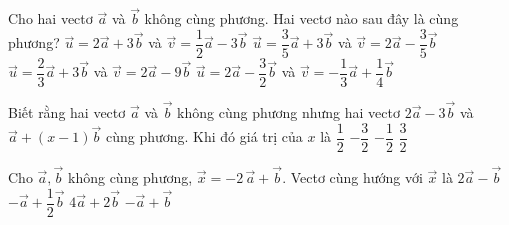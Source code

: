 \begin{ex}%
	Cho hai vectơ $\overrightarrow a $ và $\overrightarrow b $ không cùng phương. Hai vectơ nào sau đây là cùng phương?
	\choice
	{$\overrightarrow u=2\overrightarrow a+3\overrightarrow b $ và $\overrightarrow v=\dfrac{1}{2}\overrightarrow a-3\overrightarrow b $}
	{$\overrightarrow u=\dfrac{3}{5}\overrightarrow a+3\overrightarrow b $ và $\overrightarrow v=2\overrightarrow a-\dfrac{3}{5}\overrightarrow b $}
	{$\overrightarrow u=\dfrac{2}{3}\overrightarrow a+3\overrightarrow b $ và $\overrightarrow v=2\overrightarrow a-9\overrightarrow b $}
	{\True $\overrightarrow u=2\overrightarrow a-\dfrac{3}{2}\overrightarrow b $ và $\overrightarrow v=-\dfrac{1}{3}\overrightarrow a+\dfrac{1}{4}\overrightarrow b $}
\end{ex}

\begin{ex}%
	Biết rằng hai vectơ $\overrightarrow a $ và $\overrightarrow b $ không cùng phương nhưng hai vectơ $ 2\overrightarrow a-3\overrightarrow b $ và $\overrightarrow a+\left(x-1\right)\overrightarrow b $ cùng phương. Khi đó giá trị của $ x$ là
	\choice
	{$\dfrac{1}{2}$}
	{$-\dfrac{3}{2}$}
	{\True $-\dfrac{1}{2}$}
	{$\dfrac{3}{2}$}
\end{ex}

\begin{ex}%
	Cho $\overrightarrow a, \overrightarrow b $ không cùng phương, $\overrightarrow{x }=-2\,\overrightarrow{a}+\overrightarrow{b}$. Vectơ cùng hướng với $\overrightarrow{x}$ là
	\choice
	{$2 \overrightarrow{a}-\overrightarrow{b}$}
	{\True $-\overrightarrow{a}+\dfrac{1}{2}\overrightarrow{b}$}
	{$4 \overrightarrow{a}+2\overrightarrow{b}$}
	{$- \overrightarrow{a}+\overrightarrow{b}$}
\end{ex}

